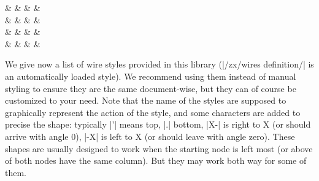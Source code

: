 \documentclass[a4paper]{ltxdoc}
\begin{document}
\begin{codeexample}[width=0pt]
{
  \def\zxDebugMode{}%
  \begin{ZX}[row sep=1pt,
    execute at begin picture={%
      \def\Zpifour{\zxFracZ[a=Zpi4]-{\pi}{4}}%
      \def\mypitwo{\zxFracX[a=mypi2]{\pi}{2}}%
    }
    ]
    & \zxN[a=n]{}  & \zxZ[a=xmiddle]{}       &            & \zxN[a=out1]{} \\
    \zxN[a=in1]{} & \Zpifour{}   & \zxX[a=Xdown]{}         & \mypitwo{} &                \\
    &              &                         &            & \zxN[a=out2]{} \\
    \zxN[a=in2]{} & \zxX[a=X1]{} & \zxZ[a=toprightpi]{\pi} &            & \zxN[a=out3]{}
    \ar[from=in1,to=X1,s]
    \ar[from=in2,to=Zpi4,.>]
    \ar[from=X1,to=xmiddle,N'=70]
    \ar[from=X1,to=toprightpi,H]
    \ar[from=Zpi4,to=n,C] \ar[from=n,to=xmiddle,wc]
    \ar[from=Zpi4,to=Xdown]
    \ar[from=xmiddle,to=Xdown,C-]
    \ar[from=xmiddle,to=mypi2,)]
    \ar[from=mypi2,to=toprightpi,(']
    \ar[from=mypi2,to=out1,<']
    \ar[from=mypi2,to=out2,<.]
    \ar[from=Xdown,to=out3,<.]
  \end{ZX}
}
\end{codeexample}

We give now a list of wire styles provided in this library (|/zx/wires definition/| is an automatically loaded style). We recommend using them instead of manual styling to ensure they are the same document-wise, but they can of course be customized to your need. Note that the name of the styles are supposed to graphically represent the action of the style, and some characters are added to precise the shape: typically |'| means top, |.| bottom, |X-| is right to X (or should arrive with angle 0), |-X| is left to X (or should leave with angle zero). These shapes are usually designed to work when the starting node is left most (or above of both nodes have the same column). But they may work both way for some of them.
\end{document}
